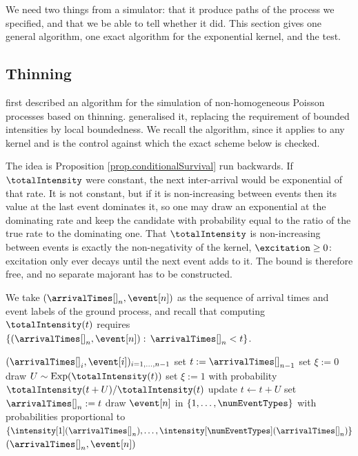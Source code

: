 We need two things from a simulator: that it produce paths of the process we specified,
and that we be able to tell whether it did.
This section gives one general algorithm, one exact algorithm for the exponential kernel,
and the test.

\subsection{Thinning}

\cite{LS79sim} first described an algorithm for the simulation of non-homogeneous Poisson
processes based on thinning.
\cite{Oga81lew} generalised it, replacing the requirement of bounded intensities by local
boundedness.
We recall the algorithm, since it applies to any kernel and is the control against which the
exact scheme below is checked.

The idea is Proposition \ref{prop.conditionalSurvival} run backwards.
If $\totalIntensity$ were constant, the next inter-arrival would be exponential of that rate.
It is not constant, but if it is non-increasing between events then its value at the last event
dominates it,
so one may draw an exponential at the dominating rate and keep the candidate with probability
equal to the ratio of the true rate to the dominating one.
That $\totalIntensity$ is non-increasing between events is exactly the non-negativity of the
kernel, $\excitation \geq 0$: excitation only ever decays until the next event adds to it.
The bound is therefore free, and no separate majorant has to be constructed.

We take $(\arrivalTimes[]_n,\event[n])$ as the sequence of arrival times and event labels
of the ground process, and recall that computing $\totalIntensity(t)$ requires
$\lbrace(\arrivalTimes[]_n,\event[n]): \, \arrivalTimes[]_n <t\rbrace$.

\begin{algorithm}[h!]
 \caption{{Ogata's thinning algorithm \citep{Oga81lew}}}
 \label{algo.ogata}
 \begin{algorithmic}[5]
  \REQUIRE $(\arrivalTimes[]_i, \event[i])_{i=1,\dots,n-1}$
  \STATE set $t:=\arrivalTimes[]_{n-1}$
  \STATE set $\xi:=0$
  \STATE draw $U \sim \text{Exp}(\totalIntensity(t))$
  \STATE set $\xi :=1$ with probability $\totalIntensity(t+U)/\totalIntensity(t)$
  \STATE update $t\leftarrow t+U$
  \ENDWHILE
  \STATE set $\arrivalTimes[]_n:=t$
  \STATE draw $\event[n]$ in $\lbrace 1,\dots,\numEventTypes\rbrace$ with probabilities proportional to $\lbrace \intensity[1](\arrivalTimes[]_n), \dots, \intensity[\numEventTypes](\arrivalTimes[]_n)\rbrace$
  \RETURN $(\arrivalTimes[]_n,\event[n])$
 \end{algorithmic}
\end{algorithm}

